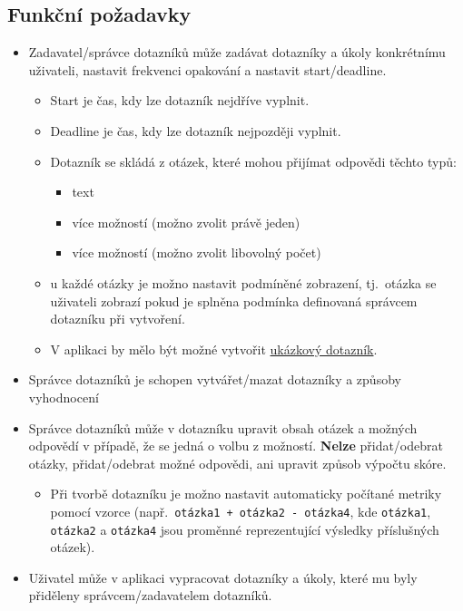 \subsection{Funkční požadavky}\label{subsec:funkcni-pozadavky}
\begin{itemize}
\item
  Zadavatel/správce dotazníků může zadávat dotazníky a úkoly konkrétnímu uživateli, nastavit frekvenci opakování a nastavit start/deadline.

  \begin{itemize}
  \item
    Start je čas, kdy lze dotazník nejdříve vyplnit.
  \item
    Deadline je čas, kdy lze dotazník nejpozději vyplnit.
  \item
    Dotazník se skládá z otázek, které mohou přijímat odpovědi těchto typů:

    \begin{itemize}
    \item
      text
    \item
      více možností (možno zvolit právě jeden)
    \item
      více možností (možno zvolit libovolný počet)
    \end{itemize}
  \item
    u každé otázky je možno nastavit podmíněné zobrazení, tj.\ otázka se uživateli zobrazí pokud je splněna podmínka definovaná správcem dotazníku při vytvoření.
  \item
    V aplikaci by mělo být možné vytvořit \hyperref[sec:ukazkovyDotaznik]{ukázkový dotazník}.
  \end{itemize}
\item
Správce dotazníků je schopen vytvářet/mazat dotazníky a způsoby vyhodnocení
\item
Správce dotazníků může v dotazníku upravit obsah otázek a možných odpovědí v případě, že se jedná o volbu z možností.
\textbf{Nelze} přidat/odebrat otázky, přidat/odebrat možné odpovědi, ani upravit způsob výpočtu skóre.

  \begin{itemize}
  \item
    Při tvorbě dotazníku je možno nastavit automaticky počítané metriky pomocí vzorce (např.\ \texttt{otázka1\ +\ otázka2\ -\ otázka4}, kde \texttt{otázka1}, \texttt{otázka2} a \texttt{otázka4} jsou proměnné reprezentující výsledky příslušných otázek).
  \end{itemize}
\item
  Uživatel může v aplikaci vypracovat dotazníky a úkoly, které mu byly přiděleny správcem/zadavatelem dotazníků.


\end{itemize}
